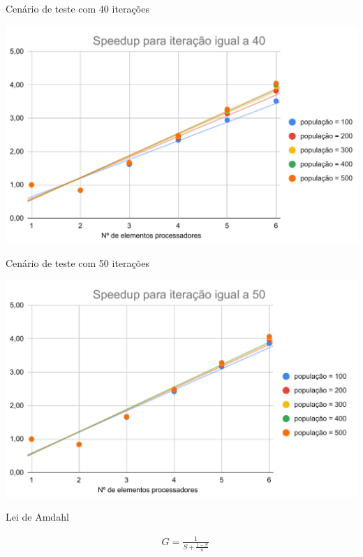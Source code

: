 \begin{graph}[h]{16cm}
    \caption{Cenário de teste com 40 iterações}
        \includegraphics[width=14cm]{graficos/Speedup para iteração igual a 40.pdf}
\end{graph}

\begin{graph}[h]{16cm}
    \caption{Cenário de teste com 50 iterações}
    \includegraphics[width=14cm]{graficos/Speedup para iteração igual a 50.pdf}
\end{graph}


Lei de Amdahl

\begin{align}
    &G=\frac{1}{S+\frac{1-S}{n}}
\end{align}